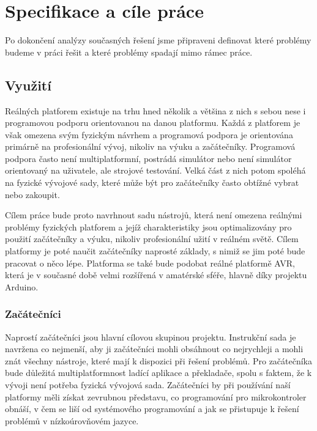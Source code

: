 \chapter{Specifikace a cíle práce}

Po dokončení analýzy současných řešení jsme připraveni definovat které problémy budeme v práci řešit a které problémy spadají mimo rámec práce.

\section{Využití}

Reálných platforem existuje na trhu hned několik a většina z nich s sebou nese i programovou podporu orientovanou na danou platformu. Každá z platforem je však omezena svým fyzickým návrhem a programová podpora je orientována primárně na profesionální vývoj, nikoliv na výuku a začátečníky. Programová podpora často není multiplatformní, postrádá simulátor nebo není simulátor orientovaný na uživatele, ale strojové testování. Velká část z nich potom spoléhá na fyzické vývojové sady, které může být pro začátečníky často obtížné vybrat nebo zakoupit.

Cílem práce bude proto navrhnout sadu nástrojů, která není omezena reálnými problémy fyzických platforem a jejíž charakteristiky jsou optimalizovány pro použití začátečníky a výuku, nikoliv profesionální užití v reálném světě. Cílem platformy je poté naučit začátečníky naprosté základy, s nimiž se jim poté bude pracovat o něco lépe. Platforma se také bude podobat reálné platformě AVR, která je v současné době velmi rozšířená v amatérské sféře, hlavně díky projektu Arduino.

\subsection{Začátečníci}

Naprostí začátečníci jsou hlavní cílovou skupinou projektu. Instrukční sada je navržena co nejmenší, aby ji začátečníci mohli obsáhnout co nejrychleji a mohli znát všechny nástroje, které mají k dispozici při řešení problémů. Pro začátečníka bude důležitá multiplatformnost ladící aplikace a překladače, spolu s faktem, že k vývoji není potřeba fyzická vývojová sada. Začátečníci by při používání naší platformy měli získat zevrubnou představu, co programování pro mikrokontroler obnáší, v čem se liší od systémového programování a jak se přistupuje k řešení problémů v nízkoúrovňovém jazyce.

